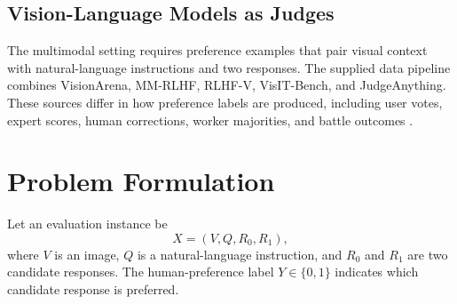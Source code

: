 \documentclass[11pt]{article}
\begin{document}
\subsection{Vision-Language Models as Judges}
The multimodal setting requires preference examples that pair visual context with natural-language instructions and two responses. The supplied data pipeline combines VisionArena, MM-RLHF, RLHF-V, VisIT-Bench, and JudgeAnything. These sources differ in how preference labels are produced, including user votes, expert scores, human corrections, worker majorities, and battle outcomes \citep{chou2024visionarena,zhang2025mmrlhf,yu2024rlhfv,bitton2023visitbench,pu2025judgeanything}.




\section{Problem Formulation}

Let an evaluation instance be
\[
    X=(V,Q,R_0,R_1),
\]
where $V$ is an image, $Q$ is a natural-language instruction, and
$R_0$ and $R_1$ are two candidate responses. The human-preference label
$Y\in\{0,1\}$ indicates which candidate response is preferred.
\end{document}
